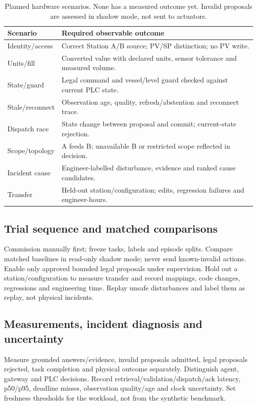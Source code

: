 \begin{table}[t]
\centering\footnotesize
\caption{Planned hardware scenarios. None has a measured outcome yet. Invalid proposals are assessed in shadow mode, not sent to actuators.}
\label{tab:hardware-plan}
\begin{tabular}{@{}P{2.4cm}P{5.5cm}@{}}
\toprule
Scenario & Required observable outcome \\
\midrule
Identity/access & Correct Station A/B source; PV/SP distinction; no PV write. \\
Units/fill & Converted value with declared units, sensor tolerance and measured volume. \\
State/guard & Legal command and vessel/level guard checked against current PLC state. \\
Stale/reconnect & Observation age, quality, refresh/abstention and reconnect trace. \\
Dispatch race & State change between proposal and commit; current-state rejection. \\
Scope/topology & A feeds B; unavailable B or restricted scope reflected in decision. \\
Incident cause & Engineer-labelled disturbance, evidence and ranked cause candidates. \\
Transfer & Held-out station/configuration; edits, regression failures and engineer-hours. \\
\bottomrule
\end{tabular}
\end{table}

\subsection{Trial sequence and matched comparisons}
Commission manually first; freeze tasks, labels and episode splits. Compare
matched baselines in read-only shadow mode; never send known-invalid actions.
Enable only approved bounded legal proposals under supervision. Hold out a
station/configuration to measure transfer and record mappings, code changes,
regressions and engineering time. Replay unsafe disturbances and label them as
replay, not physical incidents.

\subsection{Measurements, incident diagnosis and uncertainty}
Measure grounded answers/evidence, invalid proposals admitted, legal proposals
rejected, task completion and physical outcome separately. Distinguish agent,
gateway and PLC decisions. Record retrieval/validation/dispatch/ack latency,
p50/p95, deadline misses, observation quality/age and clock uncertainty. Set
freshness thresholds for the workload, not from the synthetic benchmark.

